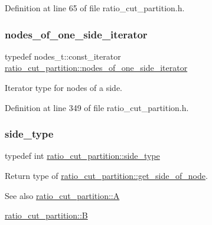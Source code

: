 Definition at line 65 of file ratio\+\_\+cut\+\_\+partition.\+h.

\mbox{\label{classratio__cut__partition_af438a591f6559b479bf40e9ac9cfcf0e}} 
\subsubsection{\texorpdfstring{nodes\+\_\+of\+\_\+one\+\_\+side\+\_\+iterator}{nodes\_of\_one\_side\_iterator}}
{\footnotesize\ttfamily typedef nodes\+\_\+t\+::const\+\_\+iterator \mbox{\hyperlink{classratio__cut__partition_af438a591f6559b479bf40e9ac9cfcf0e}{ratio\+\_\+cut\+\_\+partition\+::nodes\+\_\+of\+\_\+one\+\_\+side\+\_\+iterator}}}

Iterator type for nodes of a side. 

Definition at line 349 of file ratio\+\_\+cut\+\_\+partition.\+h.

\mbox{\label{classratio__cut__partition_ace53442bd0c1e21fbf00858ec6f6b456}} 
\subsubsection{\texorpdfstring{side\+\_\+type}{side\_type}}
{\footnotesize\ttfamily typedef int \mbox{\hyperlink{classratio__cut__partition_ace53442bd0c1e21fbf00858ec6f6b456}{ratio\+\_\+cut\+\_\+partition\+::side\+\_\+type}}}

Return type of \mbox{\hyperlink{classratio__cut__partition_a3b0a7dcc26c9ca25016abf2cebf250fe}{ratio\+\_\+cut\+\_\+partition\+::get\+\_\+side\+\_\+of\+\_\+node}}.

\begin{DoxySeeAlso}{See also}
\mbox{\hyperlink{classratio__cut__partition_a9c0da5ad845b01bddbc1f238fa35cdd0}{ratio\+\_\+cut\+\_\+partition\+::A}} 

\mbox{\hyperlink{classratio__cut__partition_adf075987228d8adc7950d5b1ba332daa}{ratio\+\_\+cut\+\_\+partition\+::B}} 
\end{DoxySeeAlso}


